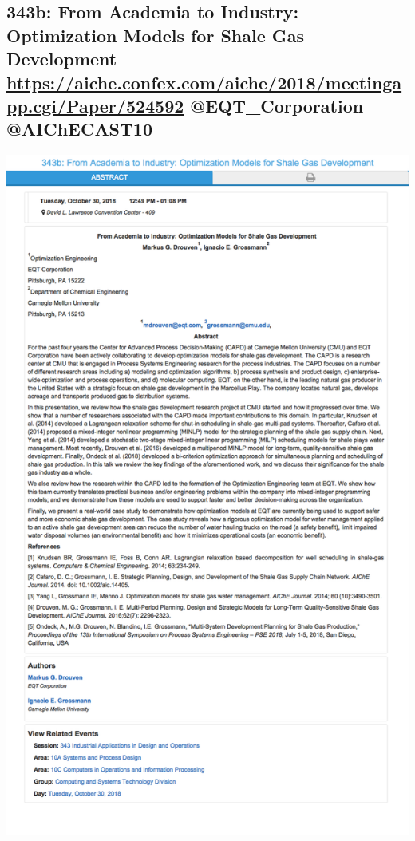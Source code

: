 \documentclass[11pt]{article}
\begin{document}
\subsection{343b: From Academia to Industry: Optimization Models for Shale Gas Development \url{https://aiche.confex.com/aiche/2018/meetingapp.cgi/Paper/524592} @EQT\_Corporation @AIChECAST10}
\label{sec:org7f192b0}
\begin{center}
\includegraphics[width=.9\linewidth]{./524592.png}
\end{center}
\end{document}
